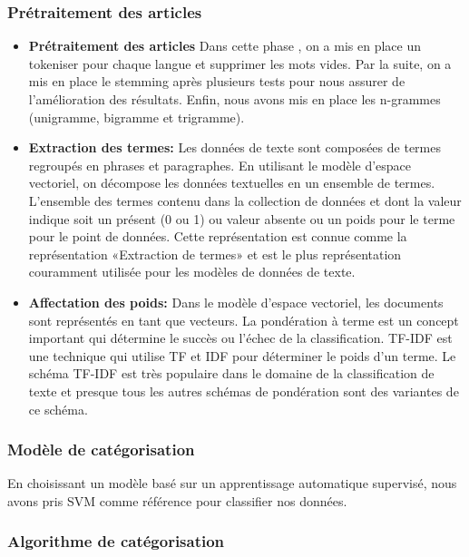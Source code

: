\subsubsection{Prétraitement des articles}

\begin{itemize}
\item \textbf{Prétraitement des articles}
Dans cette phase , on a mis en place un tokeniser pour chaque langue et supprimer les mots vides. Par la suite, on a mis en place le stemming après plusieurs tests pour nous assurer de l'amélioration des résultats. Enfin, nous avons mis en place les n-grammes (unigramme, bigramme et trigramme).

\item \textbf{Extraction des termes:}
Les données de texte sont composées de termes regroupés en phrases et paragraphes. En utilisant le modèle d'espace vectoriel, on décompose les données textuelles en un ensemble de termes.\\
L'ensemble des termes contenu dans la collection de données et dont la valeur indique soit un présent (0 ou 1) ou valeur absente ou un poids pour le terme pour le point de données. Cette représentation est connue comme la représentation «Extraction de termes» et est le plus représentation couramment utilisée pour les modèles de données de texte.

\item \textbf{Affectation des poids:}
Dans le modèle d'espace vectoriel, les documents sont représentés en tant que vecteurs. La pondération à terme est un concept important qui détermine le succès ou l'échec de la classification. TF-IDF est une technique qui utilise TF et IDF pour déterminer le poids d'un terme. Le schéma TF-IDF est très populaire dans le domaine de la classification de texte et presque tous les autres schémas de pondération sont des variantes de ce schéma.
\end{itemize}


\subsubsection{Modèle de catégorisation}
En choisissant un modèle basé sur un apprentissage automatique supervisé, nous avons pris SVM comme référence pour classifier nos données.  

\subsubsection{Algorithme de catégorisation}

